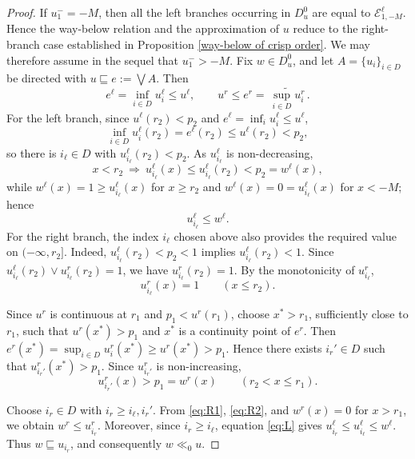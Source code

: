 \documentclass[preprint,3p,times]{elsarticle}
\theoremstyle{plain}
\theoremstyle{definition}
\numberwithin{equation}{section}
\begin{document}
\begin{proof}
If \(u_1^-=-M\), then all the left branches occurring in
\(D_u^0\) are equal to \(\mathcal E^\ell_{1,-M}\). Hence the
way-below relation and the approximation of \(u\) reduce to the
right-branch case established in Proposition
\ref{way-below of crisp order}. We may therefore assume in the
sequel that \(u_1^->-M\). Fix $w\in D_u^0$, and let $A=\{u_i\}_{i\in D}$ be directed with $u\sqsubseteq e:=\bigvee A$.
Then
\[
e^\ell=\inf_{i\in D}u_i^\ell\le u^\ell,\qquad u^r\le e^r=\widetilde{\,\sup_{i\in D}u_i^r\,}.
\]
For the left branch, since $u^\ell(r_2)<p_2$ and $e^\ell=\inf_i u_i^\ell\le u^\ell$,
\[
\inf_{i\in D}u_i^\ell(r_2)=e^\ell(r_2)\le u^\ell(r_2)<p_2,
\]
so there is $i_\ell\in D$ with $u_{i_\ell}^\ell(r_2)<p_2$. As $u_{i_\ell}^\ell$ is non-decreasing,
\[
x<r_2\ \Rightarrow\ u_{i_\ell}^\ell(x)\le u_{i_\ell}^\ell(r_2)<p_2=w^\ell(x),
\]
while $w^\ell(x)=1\ge u_{i_\ell}^\ell(x)$ for $x\ge r_2$ and $w^\ell(x)=0=u_{i_\ell}^\ell(x)$
for $x<-M$; hence
\begin{equation}\label{eq:L}
u_{i_\ell}^\ell\le w^\ell.
\end{equation}
For the right branch, the index \(i_\ell\) chosen above also
provides the required value on \((-\infty,r_2]\). Indeed,
\(u_{i_\ell}^\ell(r_2)<p_2<1\) implies \(u_{i_\ell}^\ell(r_2)<1\).
Since \(u_{i_\ell}^\ell(r_2)\vee u_{i_\ell}^r(r_2)=1\), we have
\(u_{i_\ell}^r(r_2)=1\). By the monotonicity of \(u_{i_\ell}^r\),
\begin{equation}\label{eq:R1}
u_{i_\ell}^r(x)=1\qquad (x\le r_2).
\end{equation}

Since \(u^r\) is continuous at \(r_1\) and \(p_1<u^r(r_1)\),
choose \(x^*>r_1\), sufficiently close to \(r_1\), such that
\(u^r(x^*)>p_1\) and \(x^*\) is a continuity point of \(e^r\).
Then \(e^r(x^*)=\sup_{i\in D}u_i^r(x^*)\ge u^r(x^*)>p_1\).
Hence there exists \(i_r'\in D\) such that \(u_{i_r'}^r(x^*)>p_1\).
Since \(u_{i_r'}^r\) is non-increasing,
\begin{equation}\label{eq:R2}
u_{i_r'}^r(x)>p_1=w^r(x)
\qquad (r_2<x\le r_1).
\end{equation}

Choose \(i_r\in D\) with \(i_r\ge i_\ell,i_r'\). From
\eqref{eq:R1}, \eqref{eq:R2}, and \(w^r(x)=0\) for \(x>r_1\),
we obtain \(w^r\le u_{i_r}^r\). Moreover, since \(i_r\ge i_\ell\),
equation \eqref{eq:L} gives \(u_{i_r}^\ell\le u_{i_\ell}^\ell\le w^\ell\).
Thus \(w\sqsubseteq u_{i_r}\), and consequently \(w\ll_0u\).


\end{proof}
\end{document}
